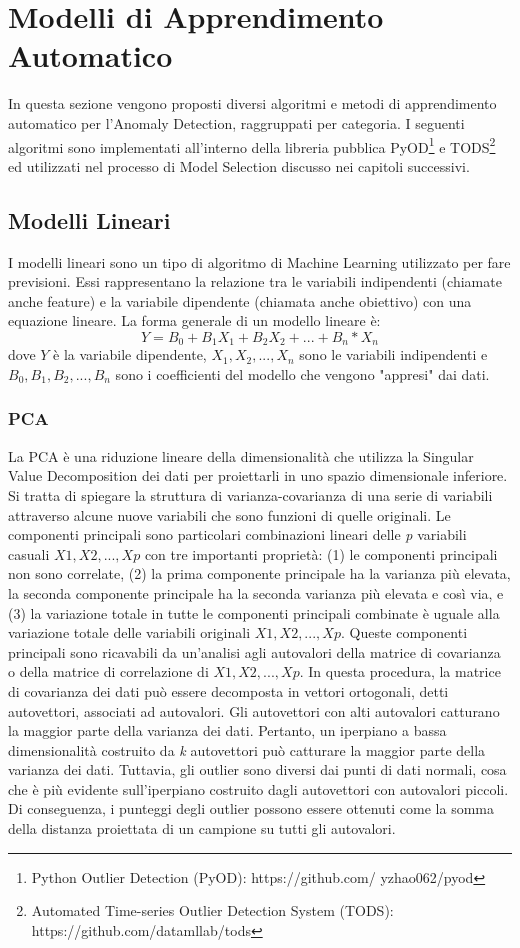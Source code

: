 \section{Modelli di Apprendimento Automatico}
In questa sezione vengono proposti diversi algoritmi e metodi di apprendimento automatico per l'Anomaly Detection, raggruppati per categoria.
I seguenti algoritmi sono implementati all'interno della libreria pubblica PyOD\footnote{Python Outlier Detection (PyOD): https://github.com/
yzhao062/pyod} e TODS\footnote{Automated Time-series Outlier Detection System
 (TODS): https://github.com/datamllab/tods} ed utilizzati nel processo di Model Selection discusso nei capitoli successivi.

\subsection{Modelli Lineari}
I modelli lineari sono un tipo di algoritmo di Machine Learning utilizzato per fare previsioni. Essi rappresentano la relazione tra le variabili indipendenti (chiamate anche feature) e la variabile dipendente (chiamata anche obiettivo) con una equazione lineare. La forma generale di un modello lineare è: 
\[ Y = B_0 + B_1X_1 + B_2X_2 + ... + B_n*X_n\]
dove $ Y $ è la variabile dipendente,  \(X_1, X_2, ..., X_n\)  sono le variabili indipendenti e \( B_0, B_1, B_2, ..., B_n\) sono i coefficienti del modello che vengono "appresi" dai dati.

\subsubsection{PCA}
La PCA \cite{shyu2003novel} è una riduzione lineare della dimensionalità che utilizza la Singular Value Decomposition dei dati per proiettarli in uno spazio dimensionale inferiore. Si tratta di spiegare la struttura di varianza-covarianza di una serie di variabili attraverso alcune nuove variabili che sono funzioni di quelle originali. Le componenti principali sono particolari combinazioni lineari delle \textit{p} variabili casuali  \(X1, X2, ..., Xp\) con tre importanti proprietà: (1) le componenti principali non sono correlate, (2) la prima componente principale ha la varianza più elevata, la seconda componente principale ha la seconda varianza più elevata e così via, e (3) la variazione totale in tutte le componenti principali combinate è uguale alla variazione totale delle variabili originali \(X1, X2, ..., Xp\). 
Queste componenti principali sono ricavabili da un'analisi agli autovalori della matrice di covarianza o della matrice di correlazione di \(X1, X2, ..., Xp\).
In questa procedura, la matrice di covarianza dei dati può essere decomposta in vettori ortogonali, detti autovettori, associati ad autovalori. Gli autovettori con alti autovalori catturano la maggior parte della varianza dei dati. Pertanto, un iperpiano a bassa dimensionalità costruito da \textit{k} autovettori può catturare la maggior parte della varianza dei dati. Tuttavia, gli outlier sono diversi dai punti di dati normali, cosa che è più evidente sull'iperpiano costruito dagli autovettori con autovalori piccoli.
Di conseguenza, i punteggi degli outlier possono essere ottenuti come la somma della distanza proiettata di un campione su tutti gli autovalori.

